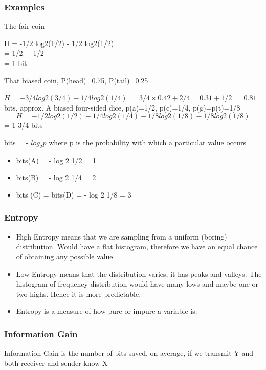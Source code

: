 \documentclass[a4]{beamer}
\begin{document}
\begin{frame}
\frametitle{Examples}
The fair coin 

H = -1/2 log2(1/2) - 1/2 log2(1/2) \\
= 1/2 + 1/2 \\
= 1 bit 

That biased coin, P(head)=0.75, P(tail)=0.25 

$H = - 3/4 log2(3/4) - 1/4 log2(1/4) $
$= 3/4\times0.42 + 2/4 = 0.31 + 1/2$ 
$= 0.81 $bits, approx. 
A biased four-sided dice, p(a)=1/2, p(c)=1/4, p(g)=p(t)=1/8 
\[
H = - 1/2 log2(1/2) - 1/4 log2(1/4) - 1/8 log2(1/8) - 1/8 log2(1/8) \]
= 1 3/4 bits 
\end{frame}
\begin{frame}
bits = - $log_2 p$  where p is the probability with which a particular value occurs
\begin{itemize}
\item  bits(A) = - log 2 1/2 = 1
\item  bits(B) = - log 2 1/4 = 2
\item  bits (C) = bits(D) = - log 2 1/8 = 3
\end{itemize}
\end{frame}
\begin{frame}
\frametitle{Entropy}
\begin{itemize}
\item High Entropy means that we are sampling from a uniform (boring) distribution.  Would have a flat histogram, therefore we have an equal chance of obtaining any possible value.
\item 
Low Entropy means that the distribution varies, it has peaks and valleys.  The histogram of frequency distribution would have many lows and maybe one or two highs.  Hence it is more predictable.
\item
Entropy is a measure of how pure or impure a variable is.
\end{itemize}
\end{frame}

\begin{frame}
\frametitle{Information Gain} 
Information Gain is the number of bits saved, on average, if we transmit Y and both receiver and sender know X


\end{frame}
\end{document}
